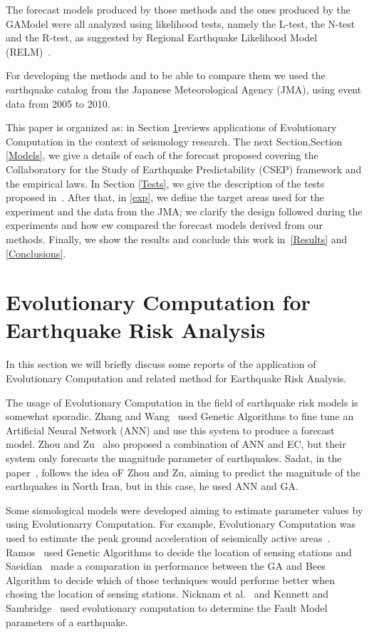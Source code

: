 The forecast models produced by those methods and the ones produced by
the GAModel were all analyzed using likelihood tests, namely the
L-test, the N-test and the R-test, as suggested by Regional Earthquake
Likelihood Model (RELM)~\cite{schorlemmer2007earthquake}.

For developing the methods and to be able to compare them we used the
earthquake catalog from the Japanese Meteorological Agency (JMA),
using event data from 2005 to 2010.

This paper is organized as: in Section \ref{estadoArte}reviews
applications of Evolutionary Computation in the context of seismology
research. The next Section,Section \ref{Models}, we give a details of
each of the forecast proposed covering the Collaboratory for the Study
of Earthquake Predictability (CSEP) framework and the empirical
laws. In Section \ref{Tests}, we give the description of the tests
proposed in~\cite{Schorlemmer2007}. After that, in \ref{exp}, we
define the target areas used for the experiment and the data from the
JMA; we clarify the design followed during the experiments and how ew
compared the forecast models derived from our methods. Finally, we
show the results and conclude this work in~\ref{Results} and
\ref{Conclusions}.

\section{Evolutionary Computation for Earthquake Risk Analysis}\label{estadoArte}
In this section we will briefly discuss some reports of the
application of Evolutionary Computation and related method for
Earthquake Risk Analysis.

The usage of Evolutionary Computation in the field of earthquake risk
models is somewhat sporadic. Zhang and Wang~\cite{Zhang2012} used
Genetic Algorithms to fine tune an Artificial Neural Network (ANN) and
use this system to produce a forecast model. Zhou and
Zu~\cite{Feiyan2014} also proposed a combination of ANN and EC, but
their system only forecasts the magnitude parameter of
earthquakes. Sadat, in the paper~\cite{sadat2015application}, follows
the idea oF Zhou and Zu, aiming to predict the magnitude of the
earthquakes in North Iran, but in this case, he used ANN and GA.

Some sismological models were developed aiming to estimate parameter
values by using Evolutionarry Computation. For example, Evolutionary
Computation was used to estimate the peak ground acceleration of
seismically active
areas~\cite{Kermani2009,Cabalar2009,Kerh2010,Kerh2015}. Ramos~\cite{Ramos2011}
used Genetic Algorithms to decide the location of sensing stations and
Saeidian~\cite{saeidian2016evaluation} made a comparation in
performance between the GA and Bees Algorithm to decide which of those
techniques would performe better when chosing the location of sensing
stations. Nicknam et al.~\cite{Nicknam2010} and Kennett and
Sambridge~\cite{Kennett1992} used evolutionary computation to
determine the Fault Model parameters of a earthquake.

